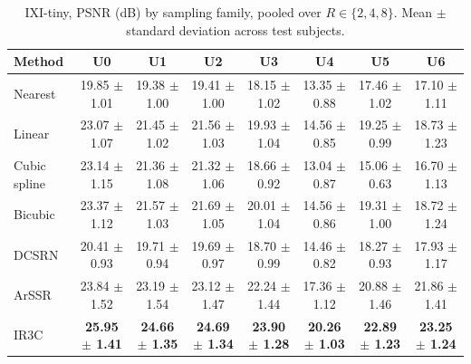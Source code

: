 \begin{table}[pos=!htbp]
\caption{IXI-tiny, PSNR (dB) by sampling family, pooled over $R\in\{2,4,8\}$. Mean $\pm$ standard deviation across test subjects.}
\label{tab:detailfam-ixi}
\footnotesize
\begin{tabular*}{\textwidth}{@{\extracolsep{\fill}}lccccccc@{}}
\toprule
Method & U0 & U1 & U2 & U3 & U4 & U5 & U6 \\
\midrule
Nearest & 19.85 $\pm$ 1.01 & 19.38 $\pm$ 1.00 & 19.41 $\pm$ 1.00 & 18.15 $\pm$ 1.02 & 13.35 $\pm$ 0.88 & 17.46 $\pm$ 1.02 & 17.10 $\pm$ 1.11 \\
Linear & 23.07 $\pm$ 1.07 & 21.45 $\pm$ 1.02 & 21.56 $\pm$ 1.03 & 19.93 $\pm$ 1.04 & 14.56 $\pm$ 0.85 & 19.25 $\pm$ 0.99 & 18.73 $\pm$ 1.23 \\
Cubic spline & 23.14 $\pm$ 1.15 & 21.36 $\pm$ 1.08 & 21.32 $\pm$ 1.06 & 18.66 $\pm$ 0.92 & 13.04 $\pm$ 0.87 & 15.06 $\pm$ 0.63 & 16.70 $\pm$ 1.13 \\
Bicubic & 23.37 $\pm$ 1.12 & 21.57 $\pm$ 1.03 & 21.69 $\pm$ 1.05 & 20.01 $\pm$ 1.04 & 14.56 $\pm$ 0.86 & 19.31 $\pm$ 1.00 & 18.72 $\pm$ 1.24 \\
DCSRN & 20.41 $\pm$ 0.93 & 19.71 $\pm$ 0.94 & 19.69 $\pm$ 0.97 & 18.70 $\pm$ 0.99 & 14.46 $\pm$ 0.82 & 18.27 $\pm$ 0.93 & 17.93 $\pm$ 1.17 \\
ArSSR & 23.84 $\pm$ 1.52 & 23.19 $\pm$ 1.54 & 23.12 $\pm$ 1.47 & 22.24 $\pm$ 1.44 & 17.36 $\pm$ 1.12 & 20.88 $\pm$ 1.46 & 21.86 $\pm$ 1.41 \\
IR3C & \textbf{25.95 $\pm$ 1.41} & \textbf{24.66 $\pm$ 1.35} & \textbf{24.69 $\pm$ 1.34} & \textbf{23.90 $\pm$ 1.28} & \textbf{20.26 $\pm$ 1.03} & \textbf{22.89 $\pm$ 1.23} & \textbf{23.25 $\pm$ 1.24} \\
\bottomrule
\end{tabular*}
\end{table}
